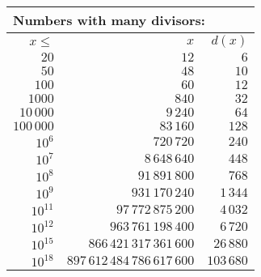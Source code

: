 \documentclass{article}
\begin{document}
\begin{center}
\begin{tabular}{|r|r|r|}
\hline
\multicolumn{3}{|l|}{Numbers with many divisors:} \\
\hline
$x \le$ & $x$ & $d(x)$ \\
\hline
$20$ & $12$ & $6$ \\
\hline
$50$ & $48$ & $10$ \\
\hline
$100$ & $60$ & $12$ \\
\hline
$1000$ & $840$ & $32$ \\
\hline
$10\,000$ & $9\,240$ & $64$ \\
\hline
$100\,000$ & $83\,160$ & $128$ \\
\hline
$10^6$ & $720\,720$ & $240$ \\
\hline
$10^7$ & $8\,648\,640$ & $448$ \\
\hline
$10^8$ & $91\,891\,800$ & $768$ \\
\hline
$10^9$ & $931\,170\,240$ & $1\,344$ \\
\hline
$10^{11}$ & $97\,772\,875\,200$ & $4\,032$ \\
\hline
$10^{12}$ & $963\,761\,198\,400$ & $6\,720$ \\
\hline
$10^{15}$ & $866\,421\,317\,361\,600$ & $26\,880$ \\
\hline
$10^{18}$ & $897\,612\,484\,786\,617\,600$ & $103\,680$ \\
\hline
\end{tabular}
\end{center}
\end{document}
